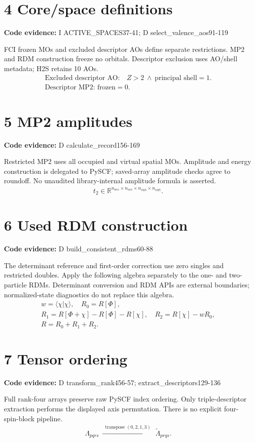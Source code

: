 \documentclass[10pt,a4paper]{article}
\newcommand{\stage}[2]{\section*{#1}\textbf{Code evidence:} #2\par}
\begin{document}
\par\noindent\begin{minipage}{\linewidth}
\stage{4 Core/space definitions}{I ACTIVE\_SPACES37-41; D select\_valence\_aos91-119}
FCI frozen MOs and excluded descriptor AOs define separate restrictions. MP2 and RDM construction freeze no orbitals. Descriptor exclusion uses AO/shell metadata; H2S retains 10 AOs.
\[
\begin{gathered}
\text{Excluded descriptor AO:}\quad Z>2\ \land\ \text{principal shell}=1.\\ \text{Descriptor MP2: frozen}=0.
\end{gathered}
\]
\end{minipage}\par\vspace{4pt}
\par\noindent\begin{minipage}{\linewidth}
\stage{5 MP2 amplitudes}{D calculate\_record156-169}
Restricted MP2 uses all occupied and virtual spatial MOs. Amplitude and energy construction is delegated to PySCF; saved-array amplitude checks agree to roundoff. No unaudited library-internal amplitude formula is asserted.
\[
\begin{gathered}
t_2\in\mathbb R^{n_{\mathrm{occ}}\times n_{\mathrm{occ}}\times n_{\mathrm{virt}}\times n_{\mathrm{virt}}}.
\end{gathered}
\]
\end{minipage}\par\vspace{4pt}
\par\noindent\begin{minipage}{\linewidth}
\stage{6 Used RDM construction}{D build\_consistent\_rdms60-88}
The determinant reference and first-order correction use zero singles and restricted doubles. Apply the following algebra separately to the one- and two-particle RDMs. Determinant conversion and RDM APIs are external boundaries; normalized-state diagnostics do not replace this algebra.
\[
\begin{gathered}
w=\langle\chi|\chi\rangle,\quad R_0=R[\Phi],\\ R_1=R[\Phi+\chi]-R[\Phi]-R[\chi],\quad R_2=R[\chi]-wR_0,\\ R=R_0+R_1+R_2.
\end{gathered}
\]
\end{minipage}\par\vspace{4pt}
\par\noindent\begin{minipage}{\linewidth}
\stage{7 Tensor ordering}{D transform\_rank456-57; extract\_descriptors129-136}
Full rank-four arrays preserve raw PySCF index ordering. Only triple-descriptor extraction performs the displayed axis permutation. There is no explicit four-spin-block pipeline.
\[
\begin{gathered}
\Lambda_{pqrs}\ \xrightarrow{\ \operatorname{transpose}(0,2,1,3)\ }\ \widetilde\Lambda_{prqs}.
\end{gathered}
\]
\end{minipage}\par\vspace{4pt}
\end{document}
